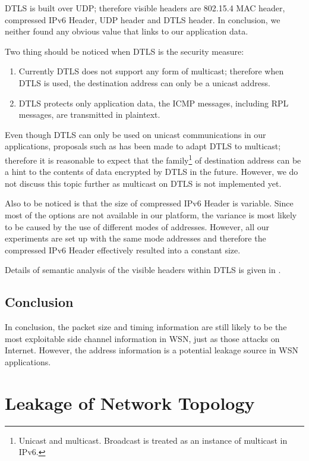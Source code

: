DTLS is built over UDP; therefore visible headers are 802.15.4 MAC header, compressed IPv6 Header, UDP header and DTLS header. In conclusion, we neither found any obvious value that links to our application data.

Two thing should be noticed when DTLS is the security measure:
\begin{enumerate}
	\item Currently DTLS does not support any form of multicast; therefore when DTLS is used, the destination address can only be a unicast address. 

	\item DTLS protects only application data, the ICMP messages, including RPL messages, are transmitted in plaintext.
\end{enumerate}

Even though DTLS can only be used on unicast communications in our applications, proposals such as \cite{DtlsMulticast1} \cite{DtlsMulticast2} has been made to adapt DTLS to multicast; therefore it is reasonable to expect that the family\footnote{Unicast and multicast. Broadcast is treated as an instance of multicast in IPv6.} of destination address can be a hint to the contents of data encrypted by DTLS in the future. However, we do not discuss this topic further as multicast on DTLS is not implemented yet.

Also to be noticed is that the size of compressed IPv6 Header is variable. Since most of the options are not available in our platform, the variance is most likely to be caused by the use of different modes of addresses. However, all our experiments are set up with the same mode addresses and therefore the compressed IPv6 Header effectively resulted into a constant size.

Details of semantic analysis of the visible headers within DTLS is given in . 

\subsection{Conclusion}

In conclusion, the packet size and timing information are still likely to be the most exploitable side channel information in WSN, just as those attacks on Internet. However, the address information is a potential leakage source in WSN applications.

\section{Leakage of Network Topology} \label{Sec: Leakage of Network Topology}

